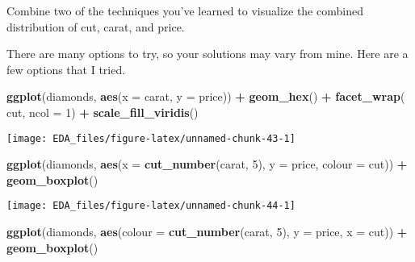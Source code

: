 \documentclass[]{book}
\newenvironment{Shaded}{\begin{snugshade}}{\end{snugshade}}
\newcommand{\DataTypeTok}[1]{\textcolor[rgb]{0.13,0.29,0.53}{#1}}
\newcommand{\DecValTok}[1]{\textcolor[rgb]{0.00,0.00,0.81}{#1}}
\newcommand{\KeywordTok}[1]{\textcolor[rgb]{0.13,0.29,0.53}{\textbf{#1}}}
\newcommand{\NormalTok}[1]{#1}
\newcommand{\OperatorTok}[1]{\textcolor[rgb]{0.81,0.36,0.00}{\textbf{#1}}}
\newcommand{\StringTok}[1]{\textcolor[rgb]{0.31,0.60,0.02}{#1}}
\theoremstyle{plain}
\theoremstyle{remark}
\theoremstyle{definition}
\theoremstyle{definition}
\theoremstyle{definition}
\theoremstyle{remark}
\begin{document}
Combine two of the techniques you've learned to visualize the combined
distribution of cut, carat, and price.

There are many options to try, so your solutions may vary from mine.
Here are a few options that I tried.

\begin{Shaded}
\begin{Highlighting}[]
\KeywordTok{ggplot}\NormalTok{(diamonds, }\KeywordTok{aes}\NormalTok{(}\DataTypeTok{x =}\NormalTok{ carat, }\DataTypeTok{y =}\NormalTok{ price)) }\OperatorTok{+}
\StringTok{  }\KeywordTok{geom_hex}\NormalTok{() }\OperatorTok{+}
\StringTok{  }\KeywordTok{facet_wrap}\NormalTok{(}\OperatorTok{~}\StringTok{ }\NormalTok{cut, }\DataTypeTok{ncol =} \DecValTok{1}\NormalTok{) }\OperatorTok{+}
\StringTok{  }\KeywordTok{scale_fill_viridis}\NormalTok{()}
\end{Highlighting}
\end{Shaded}

\begin{center}\texttt{[image: EDA\_files/figure-latex/unnamed-chunk-43-1]} \end{center}

\begin{Shaded}
\begin{Highlighting}[]
\KeywordTok{ggplot}\NormalTok{(diamonds, }\KeywordTok{aes}\NormalTok{(}\DataTypeTok{x =} \KeywordTok{cut_number}\NormalTok{(carat, }\DecValTok{5}\NormalTok{), }\DataTypeTok{y =}\NormalTok{ price, }\DataTypeTok{colour =}\NormalTok{ cut)) }\OperatorTok{+}
\StringTok{  }\KeywordTok{geom_boxplot}\NormalTok{()}
\end{Highlighting}
\end{Shaded}

\begin{center}\texttt{[image: EDA\_files/figure-latex/unnamed-chunk-44-1]} \end{center}

\begin{Shaded}
\begin{Highlighting}[]
\KeywordTok{ggplot}\NormalTok{(diamonds, }\KeywordTok{aes}\NormalTok{(}\DataTypeTok{colour =} \KeywordTok{cut_number}\NormalTok{(carat, }\DecValTok{5}\NormalTok{), }\DataTypeTok{y =}\NormalTok{ price, }\DataTypeTok{x =}\NormalTok{ cut)) }\OperatorTok{+}
\StringTok{  }\KeywordTok{geom_boxplot}\NormalTok{()}
\end{Highlighting}
\end{Shaded}
\end{document}
